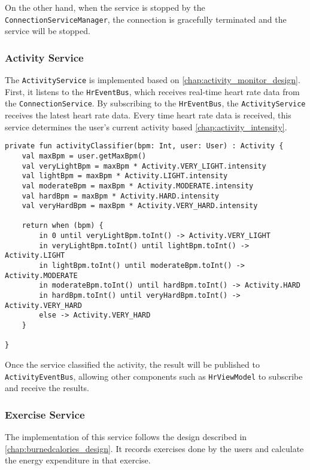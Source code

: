 On the other hand, when the service is stopped by the \verb;ConnectionServiceManager;, the connection is gracefully terminated and the service will be stopped.

\subsubsection{Activity Service}
The \verb;ActivityService; is implemented based on \autoref{chap:activity_monitor_design}.
First, it listens to the \verb;HrEventBus;, which receives real-time heart rate data from the \verb;ConnectionService;. 
By subscribing to the \verb;HrEventBus;, the \verb;ActivityService; receives the latest heart rate data.
Every time heart rate data is received, this service determines the user's current activity based \autoref{chap:activity_intensity}.
\begin{lstlisting}[caption={Activity classifier (ActivityService)}]
private fun activityClassifier(bpm: Int, user: User) : Activity {
    val maxBpm = user.getMaxBpm()
    val veryLightBpm = maxBpm * Activity.VERY_LIGHT.intensity
    val lightBpm = maxBpm * Activity.LIGHT.intensity
    val moderateBpm = maxBpm * Activity.MODERATE.intensity
    val hardBpm = maxBpm * Activity.HARD.intensity
    val veryHardBpm = maxBpm * Activity.VERY_HARD.intensity

    return when (bpm) {
        in 0 until veryLightBpm.toInt() -> Activity.VERY_LIGHT
        in veryLightBpm.toInt() until lightBpm.toInt() -> Activity.LIGHT
        in lightBpm.toInt() until moderateBpm.toInt() -> Activity.MODERATE
        in moderateBpm.toInt() until hardBpm.toInt() -> Activity.HARD
        in hardBpm.toInt() until veryHardBpm.toInt() -> Activity.VERY_HARD
        else -> Activity.VERY_HARD
    }

}
\end{lstlisting}

Once the service classified the activity, the result will be published to \verb;ActivityEventBus;, allowing other components such as \verb;HrViewModel; to subscribe and receive the results.

\subsubsection{Exercise Service}
The implementation of this service follows the design described in \autoref{chap:burnedcalories_design}.
It records exercises done by the users and calculate the energy expenditure in that exercise.

